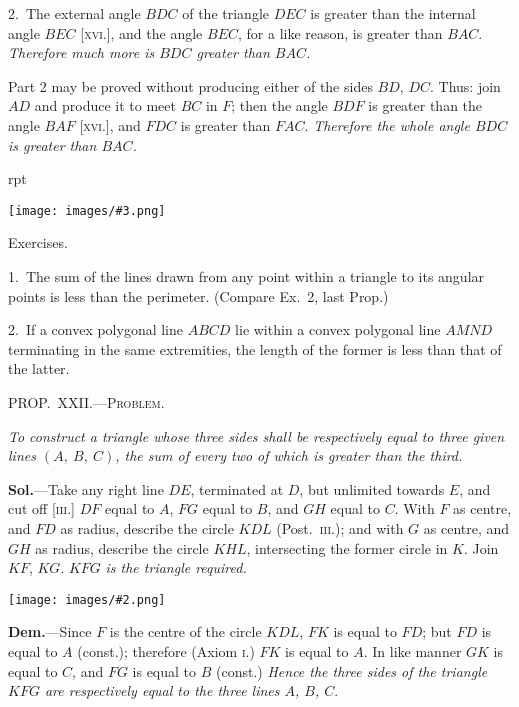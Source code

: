 \documentclass[oneside]{book}
\newcounter{wrapwidth}
\newcommand\mypropl[2]{
\bigskip\Needspace*{4\baselineskip}\begin{center}\textsc{#1}\end{center}
\hspace{\parindent}\emph{#2}\par\medskip
}
\newcommand\exheadin[1]{
\par\medskip\Needspace*{4\baselineskip}
\hspace{1.5\parindent}\textsf{#1}\par\medskip
}
\newcommand\imgflow[3]{
\setcounter{wrapwidth}{#1}
\begin{wrapfigure}[#2]{r}{\value{wrapwidth}pt}
\begin{center}
\vspace{-0.3in}
\texttt{[image: images/\#3.png]}
\end{center}
\end{wrapfigure}
}
\newcommand\imgcent[2]{
\begin{center}
\texttt{[image: images/\#2.png]}
\end{center}
}
\begin{document}

2.~The external angle $BDC$ of the triangle $DEC$ is
greater than the internal angle $BEC$ [\textsc{xvi}.], and the angle
$BEC$, for a like reason, is greater than $BAC$. \emph{Therefore
much more is $BDC$ greater than $BAC$.}

Part 2 may be proved without producing either of
the sides $BD$, $DC$. Thus: join $AD$ and produce it to
meet $BC$ in $F$; then the angle $BDF$ is greater than
the angle $BAF$ [\textsc{xvi}.], and $FDC$ is greater than $FAC$.
\emph{Therefore the whole angle $BDC$ is greater than $BAC$.}

\imgflow{138}{8}{f038}

\exheadin{Exercises.}

\begin{footnotesize}
1.~The sum of the lines drawn from any point within a triangle
to its angular points is less than
the perimeter. (Compare Ex.~2,
last Prop.)

2.~If a convex polygonal line
$ABCD$ lie within a convex polygonal
line $AMND$ terminating in
the same extremities, the length of
the former is less than that of the
latter.

\par\end{footnotesize}


\mypropl{PROP\@.~XXII\@.---Problem.}{To construct a triangle whose three sides shall be respectively
equal to three given lines $(A,\ B,\ C)$, the sum of every
two of which is greater than the third.}

\textbf{Sol.}---Take any right line $DE$, terminated at $D$, but
unlimited towards $E$, and cut off [\textsc{iii}.] $DF$ equal to $A$,
$FG$ equal to $B$, and $GH$ equal to $C$. With $F$ as centre,
and $FD$ as radius, describe the circle $KDL$ (Post.~\textsc{iii}.);
and with $G$ as centre, and $GH$ as radius, describe the
circle $KHL$, intersecting the former circle in $K$. Join
$KF$, $KG$. $KFG$ \emph{is the triangle required.}

\imgcent{290}{f039}

\textbf{Dem.}---Since $F$ is the centre of the circle $KDL$, $FK$
is equal to $FD$; but $FD$ is equal to $A$ (const.); therefore
(Axiom \textsc{i}.) $FK$ is equal to $A$. In like manner $GK$
is equal to $C$, and $FG$ is equal to $B$ (const.) \textit{Hence
the three sides of the triangle $KFG$ are respectively equal
to the three lines $A$, $B$, $C$}.
\end{document}
